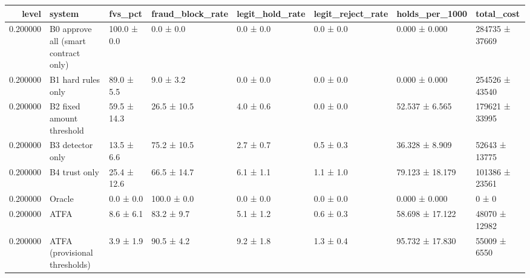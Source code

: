 \begin{tabular}{rlllllll}
\toprule
level & system & fvs\_pct & fraud\_block\_rate & legit\_hold\_rate & legit\_reject\_rate & holds\_per\_1000 & total\_cost \\
\midrule
0.200000 & B0 approve all (smart contract only) & 100.0 ± 0.0 & 0.0 ± 0.0 & 0.0 ± 0.0 & 0.0 ± 0.0 & 0.000 ± 0.000 & 284735 ± 37669 \\
0.200000 & B1 hard rules only & 89.0 ± 5.5 & 9.0 ± 3.2 & 0.0 ± 0.0 & 0.0 ± 0.0 & 0.000 ± 0.000 & 254526 ± 43540 \\
0.200000 & B2 fixed amount threshold & 59.5 ± 14.3 & 26.5 ± 10.5 & 4.0 ± 0.6 & 0.0 ± 0.0 & 52.537 ± 6.565 & 179621 ± 33995 \\
0.200000 & B3 detector only & 13.5 ± 6.6 & 75.2 ± 10.5 & 2.7 ± 0.7 & 0.5 ± 0.3 & 36.328 ± 8.909 & 52643 ± 13775 \\
0.200000 & B4 trust only & 25.4 ± 12.6 & 66.5 ± 14.7 & 6.1 ± 1.1 & 1.1 ± 1.0 & 79.123 ± 18.179 & 101386 ± 23561 \\
0.200000 & Oracle & 0.0 ± 0.0 & 100.0 ± 0.0 & 0.0 ± 0.0 & 0.0 ± 0.0 & 0.000 ± 0.000 & 0 ± 0 \\
0.200000 & ATFA & 8.6 ± 6.1 & 83.2 ± 9.7 & 5.1 ± 1.2 & 0.6 ± 0.3 & 58.698 ± 17.122 & 48070 ± 12982 \\
0.200000 & ATFA (provisional thresholds) & 3.9 ± 1.9 & 90.5 ± 4.2 & 9.2 ± 1.8 & 1.3 ± 0.4 & 95.732 ± 17.830 & 55009 ± 6550 \\
\bottomrule
\end{tabular}
